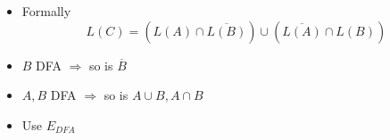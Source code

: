 \begin{frame}[allowframebreaks]
\begin{itemize}
\item Formally
  \begin{equation*}
    L(C)
=(L(A)\cap \overline{L(B)})\cup
(\overline{L(A)}\cap L(B))
  \end{equation*}
\item 
$B$ DFA $\Rightarrow$ so is $\overline{B}$

\item $A, B$ DFA $\Rightarrow$ so is 
$A\cup B, A\cap B$

\item Use $E_{DFA}$
\end{itemize}\end{frame}



